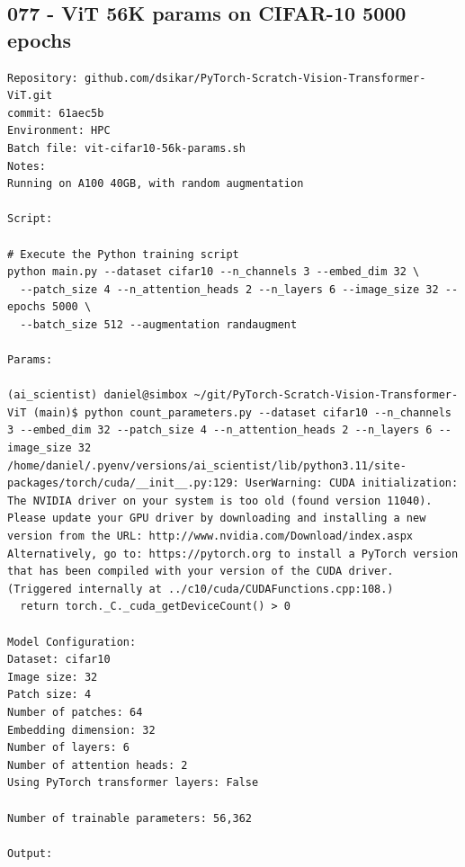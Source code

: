 \subsection{077 - ViT 56K params on CIFAR-10 5000 epochs}
\label{app_res:077}
\begin{verbatim}
Repository: github.com/dsikar/PyTorch-Scratch-Vision-Transformer-ViT.git
commit: 61aec5b
Environment: HPC 
Batch file: vit-cifar10-56k-params.sh
Notes: 
Running on A100 40GB, with random augmentation

Script:

# Execute the Python training script
python main.py --dataset cifar10 --n_channels 3 --embed_dim 32 \
  --patch_size 4 --n_attention_heads 2 --n_layers 6 --image_size 32 --epochs 5000 \
  --batch_size 512 --augmentation randaugment

Params: 

(ai_scientist) daniel@simbox ~/git/PyTorch-Scratch-Vision-Transformer-ViT (main)$ python count_parameters.py --dataset cifar10 --n_channels 3 --embed_dim 32 --patch_size 4 --n_attention_heads 2 --n_layers 6 --image_size 32 
/home/daniel/.pyenv/versions/ai_scientist/lib/python3.11/site-packages/torch/cuda/__init__.py:129: UserWarning: CUDA initialization: The NVIDIA driver on your system is too old (found version 11040). Please update your GPU driver by downloading and installing a new version from the URL: http://www.nvidia.com/Download/index.aspx Alternatively, go to: https://pytorch.org to install a PyTorch version that has been compiled with your version of the CUDA driver. (Triggered internally at ../c10/cuda/CUDAFunctions.cpp:108.)
  return torch._C._cuda_getDeviceCount() > 0

Model Configuration:
Dataset: cifar10
Image size: 32
Patch size: 4
Number of patches: 64
Embedding dimension: 32
Number of layers: 6
Number of attention heads: 2
Using PyTorch transformer layers: False

Number of trainable parameters: 56,362

Output:



\end{verbatim}

